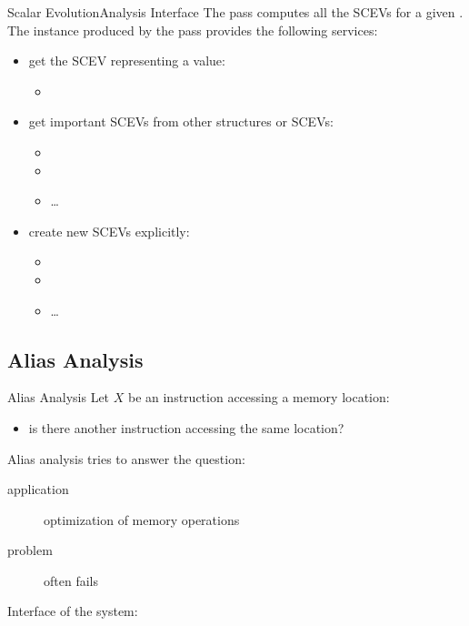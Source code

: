 \begin{frame}{Scalar Evolution}{Analysis Interface}
\centering
The  pass computes all the
SCEVs for a given .
\vfill
\centering
The  instance produced by the pass
provides the following services:
\vfill
\begin{itemize}
\item get the SCEV representing a value:
\begin{itemize}
\item      {}
\end{itemize}
\vfill
\item get important SCEVs from other structures or SCEVs:
\begin{itemize}
\item      {}
\item      {}
\item      \ldots
\end{itemize}
\vfill
\item create new SCEVs explicitly:
\begin{itemize}
\item {}
\item {}
\item \ldots
\end{itemize}
\end{itemize}
\end{frame}


\subsection{Alias Analysis}


\begin{frame}{Alias Analysis}
Let $X$ be an instruction accessing a memory location:

\begin{itemize}
\item is there another instruction accessing the same location?
\end{itemize}

\vfill
Alias analysis tries to answer the question:

\begin{description}
\item[application] optimization of memory operations
\item[problem] often fails
\end{description}

\vfill
Interface of the system: 

\end{frame}



